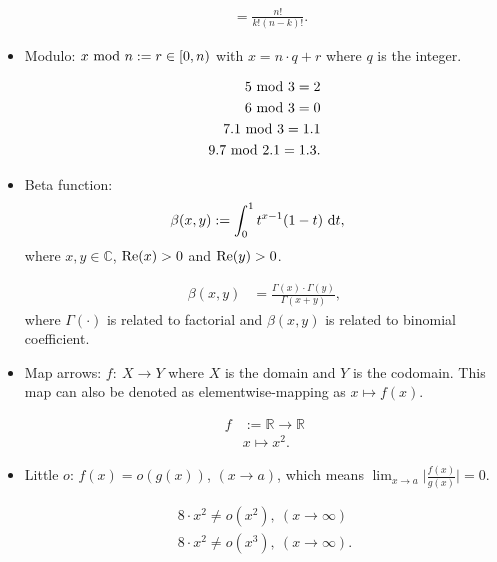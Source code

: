 \documentclass[../../note.tex]{subfiles}
\begin{document}
\begin{itemize}
\begin{align}
        &= \frac{n!}{k! (n-k)!}.
    \end{align}
    \item Modulo: $x~{\rm mod}~n:= r \in [0,n)$ with $x = n \cdot q + r$ where $q$ is the integer.
    \begin{example}
        \begin{align}
            5~{\rm mod}~3 = 2 \\
            6~{\rm mod}~3 = 0 \\
            7.1~{\rm mod}~3 = 1.1 \\
            9.7~{\rm mod}~2.1 = 1.3.
        \end{align}
    \end{example}
    \item Beta function: 
    \begin{align}
        \beta(x, y)
        &:= \int_{0}^{1} t^{x-1} (1-t)~{\rm d}t,
    \end{align}
    where $x, y \in \mathbb{C}$, ${\rm Re}(x)>0$ and ${\rm Re}(y)>0$.
    \begin{lemma}
        \label{lemma: identity between beta func. and Gamma func.}
        \begin{align}
            \beta(x,y)
            &= \frac{\Gamma(x)\cdot \Gamma(y)}{\Gamma(x+y)},
        \end{align}
        where $\Gamma(\cdot)$ is related to factorial and $\beta(x,y)$ is related to binomial coefficient.
    \end{lemma}
    \item Map arrows: $f:~ X \rightarrow Y$ where $X$ is the domain and $Y$ is the codomain. This map can also be denoted as elementwise-mapping as $x \longmapsto f(x)$.
    \begin{example}
        \begin{align}
            f
            &:= \mathbb{R} \rightarrow \mathbb{R} \\
            &x \longmapsto x^2.
        \end{align}
    \end{example}
    \item Little $o$: $f(x) = o(g(x))$, $(x \rightarrow a)$, which means $\lim_{x\rightarrow a} \vert \frac{f(x)}{g(x)} \vert = 0$.
    \begin{example}
        \begin{align}
            8 \cdot x^2 \neq o(x^2), ~(x\rightarrow \infty) \\
            8 \cdot x^2 \neq o(x^3), ~(x\rightarrow \infty).

\end{align}
\end{example}
\end{itemize}
\end{document}
